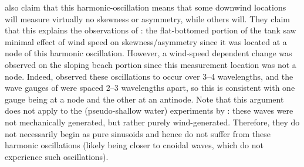 \documentclass{jfm}
\begin{document}
 also claim that this harmonic-oscillation
means that some downwind locations will measure virtually no skewness
or asymmetry, while others will.
They claim that this explains the observations of
\citet{feddersen2005wind}: the flat-bottomed portion of the tank saw
minimal effect of wind speed on skewness/asymmetry since it was located
at a node of this harmonic oscillation.
However, a wind-speed dependent change was observed on the sloping beach
portion since this measurement location was not a node.
Indeed, \citet{chapalain1992observed,liu2016modeling} observed these
oscillations to occur over \numrange{3}{4} wavelengths, and the
wave gauges of \citet{feddersen2005wind} were spaced \numrange{2}{3}
wavelengths apart, so this is consistent with one gauge being at a node
and the other at an antinode.
Note that this argument does not apply to the (pseudo-shallow water)
experiments by \citet{leykin1995asymmetry}: these waves were not
mechanically generated, but rather purely wind-generated.
Therefore, they do not necessarily begin as pure sinusoids and hence do
not suffer from these harmonic oscillations (likely being closer to
cnoidal waves, which do not experience such oscillations).
\end{document}
